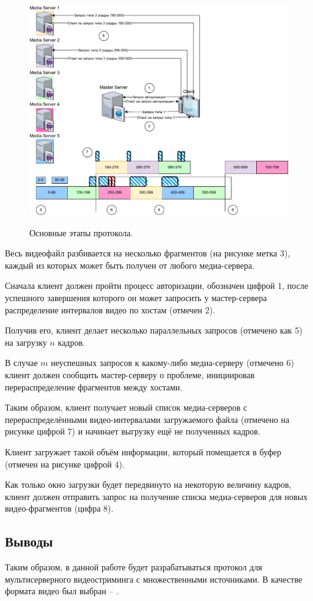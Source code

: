 \begin{figure}[h]
	\begin{center}
		{\includegraphics[scale = 0.8]{img/[all process].pdf}}
		\caption{Основные этапы протокола.}
		\label{image:general_process}
	\end{center}
\end{figure}

\pagebreak

Весь видеофайл разбивается на несколько фрагментов (на рисунке метка 3), каждый из которых может быть получен от любого медиа-сервера.

Сначала клиент должен пройти процесс авторизации, обозначен цифрой 1, после успешного завершения которого он может запросить у мастер-сервера распределение интервалов видео по хостам (отмечен 2). 

Получив его, клиент делает несколько параллельных запросов (отмечено как 5) на загрузку $n$ кадров.

В случае $m$ неуспешных запросов к какому-либо медиа-серверу (отмечено 6) клиент должен сообщить мастер-серверу о проблеме, инициировав перераспределение фрагментов между хостами. 

Таким образом, клиент получает новый список медиа-серверов с перераспределёнными видео-интервалами загружаемого файла (отмечено на рисунке цифрой 7) и начинает выгрузку ещё не полученных кадров. 

Клиент загружает такой объём информации, который помещается в буфер (отмечен на рисунке цифрой 4). 

Как только окно загрузки будет передвинуто на некоторую величину кадров, клиент должен отправить запрос на получение списка медиа-серверов для новых видео-фрагментов (цифра 8). \\

\subsection*{Выводы}
Таким образом, в данной работе будет разрабатываться протокол для мультисерверного видеостриминга с множественными источниками. В качестве формата видео был выбран -- .

















